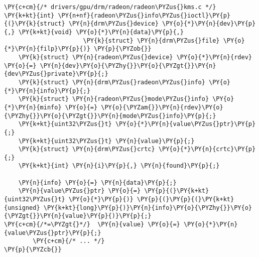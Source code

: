 \begin{Verbatim}[commandchars=\\\{\}]
\PY{c+cm}{/* drivers/gpu/drm/radeon/radeon\PYZus{}kms.c */}
\PY{k+kt}{int} \PY{n+nf}{radeon\PYZus{}info\PYZus{}ioctl}\PY{p}{(}\PY{k}{struct} \PY{n}{drm\PYZus{}device} \PY{o}{*}\PY{n}{dev}\PY{p}{,} \PY{k+kt}{void} \PY{o}{*}\PY{n}{data}\PY{p}{,}
                      \PY{k}{struct} \PY{n}{drm\PYZus{}file} \PY{o}{*}\PY{n}{filp}\PY{p}{)} \PY{p}{\PYZob{}}
	\PY{k}{struct} \PY{n}{radeon\PYZus{}device} \PY{o}{*}\PY{n}{rdev} \PY{o}{=} \PY{n}{dev}\PY{o}{\PYZhy{}}\PY{o}{\PYZgt{}}\PY{n}{dev\PYZus{}private}\PY{p}{;}
	\PY{k}{struct} \PY{n}{drm\PYZus{}radeon\PYZus{}info} \PY{o}{*}\PY{n}{info}\PY{p}{;}
	\PY{k}{struct} \PY{n}{radeon\PYZus{}mode\PYZus{}info} \PY{o}{*}\PY{n}{minfo} \PY{o}{=} \PY{o}{\PYZam{}}\PY{n}{rdev}\PY{o}{\PYZhy{}}\PY{o}{\PYZgt{}}\PY{n}{mode\PYZus{}info}\PY{p}{;}
	\PY{k+kt}{uint32\PYZus{}t} \PY{o}{*}\PY{n}{value\PYZus{}ptr}\PY{p}{;}
	\PY{k+kt}{uint32\PYZus{}t} \PY{n}{value}\PY{p}{;}
	\PY{k}{struct} \PY{n}{drm\PYZus{}crtc} \PY{o}{*}\PY{n}{crtc}\PY{p}{;}
	\PY{k+kt}{int} \PY{n}{i}\PY{p}{,} \PY{n}{found}\PY{p}{;}

	\PY{n}{info} \PY{o}{=} \PY{n}{data}\PY{p}{;}
	\PY{n}{value\PYZus{}ptr} \PY{o}{=} \PY{p}{(}\PY{k+kt}{uint32\PYZus{}t} \PY{o}{*}\PY{p}{)} \PY{p}{(}\PY{p}{(}\PY{k+kt}{unsigned} \PY{k+kt}{long}\PY{p}{)}\PY{n}{info}\PY{o}{\PYZhy{}}\PY{o}{\PYZgt{}}\PY{n}{value}\PY{p}{)}\PY{p}{;}
\PY{c+cm}{/*=\PYZgt{}*/}  \PY{n}{value} \PY{o}{=} \PY{o}{*}\PY{n}{value\PYZus{}ptr}\PY{p}{;}
        \PY{c+cm}{/* ... */}
\PY{p}{\PYZcb{}}
\end{Verbatim}
